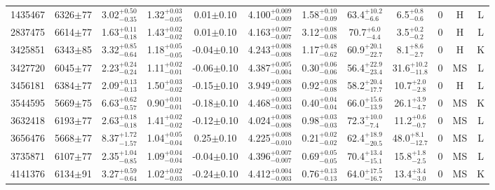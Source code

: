 \begin{longtable}{c|ccccc|ccc|ccc}
1435467 & 6326$\pm$77    & 3.02$_{-0.35}^{+0.50}$    & 1.32$_{-0.05}^{+0.03}$ & 0.01$\pm$0.10     & 4.100$_{-0.009}^{+0.009}$ & 1.58$_{-0.09}^{+0.10}$ & 63.4$_{-6.6}^{+10.2}$     & 6.5$_{-0.6}^{+0.8}$      & 0 &        H & L \\
2837475 & 6614$\pm$77    & 1.63$_{-0.18}^{+0.11}$    & 1.43$_{-0.02}^{+0.02}$ & 0.01$\pm$0.10     & 4.163$_{-0.007}^{+0.007}$ & 3.12$_{-0.08}^{+0.08}$ & 70.7$_{-4.4}^{+6.0}$      & 3.5$_{-0.2}^{+0.2}$      & 0 &        H & L \\
3425851 & 6343$\pm$85    & 3.32$_{-0.64}^{+0.85}$    & 1.18$_{-0.05}^{+0.05}$ & -0.04$\pm$0.10    & 4.243$_{-0.008}^{+0.008}$ & 1.17$_{-0.62}^{+0.48}$ & 60.9$_{-22.7}^{+20.1}$    & 8.1$_{-2.7}^{+8.6}$      & 0 &        H & K \\
3427720 & 6045$\pm$77    & 2.23$_{-0.24}^{+0.24}$    & 1.11$_{-0.01}^{+0.02}$ & -0.06$\pm$0.10    & 4.387$_{-0.004}^{+0.005}$ & 0.30$_{-0.06}^{+0.06}$ & 56.4$_{-23.4}^{+22.9}$    & 31.6$_{-11.8}^{+10.2}$   & 0 &        MS & L \\
3456181 & 6384$\pm$77    & 2.09$_{-0.13}^{+0.13}$    & 1.50$_{-0.02}^{+0.03}$ & -0.15$\pm$0.10    & 3.949$_{-0.009}^{+0.008}$ & 0.92$_{-0.08}^{+0.08}$ & 58.2$_{-17.7}^{+20.4}$    & 10.7$_{-2.8}^{+2.0}$     & 0 &        H & L \\
3544595 & 5669$\pm$75    & 6.63$_{-0.57}^{+0.62}$    & 0.90$_{-0.01}^{+0.01}$ & -0.18$\pm$0.10    & 4.468$_{-0.003}^{+0.003}$ & 0.40$_{-0.04}^{+0.04}$ & 66.0$_{-13.9}^{+15.6}$    & 26.1$_{-4.7}^{+3.9}$     & 0 &        MS & K \\
3632418 & 6193$\pm$77    & 2.63$_{-0.18}^{+0.18}$    & 1.41$_{-0.02}^{+0.02}$ & -0.12$\pm$0.10    & 4.024$_{-0.008}^{+0.008}$ & 0.98$_{-0.03}^{+0.03}$ & 72.3$_{-7.4}^{+10.0}$     & 11.2$_{-0.7}^{+0.6}$     & 0 &        MS & L \\
3656476 & 5668$\pm$77    & 8.37$_{-1.57}^{+1.72}$    & 1.04$_{-0.04}^{+0.05}$ & 0.25$\pm$0.10     & 4.225$_{-0.010}^{+0.008}$ & 0.21$_{-0.02}^{+0.02}$ & 62.4$_{-20.5}^{+18.9}$    & 48.0$_{-12.7}^{+8.1}$    & 0 &        MS & L \\
3735871 & 6107$\pm$77    & 2.35$_{-0.85}^{+1.04}$    & 1.09$_{-0.04}^{+0.04}$ & -0.04$\pm$0.10    & 4.396$_{-0.007}^{+0.007}$ & 0.69$_{-0.05}^{+0.05}$ & 70.4$_{-15.1}^{+13.4}$    & 15.8$_{-2.5}^{+1.8}$     & 0 &        MS & L \\
4141376 & 6134$\pm$91    & 3.27$_{-0.64}^{+0.59}$    & 1.02$_{-0.03}^{+0.02}$ & -0.24$\pm$0.10    & 4.412$_{-0.003}^{+0.004}$ & 0.76$_{-0.13}^{+0.13}$ & 64.0$_{-16.7}^{+17.5}$    & 13.4$_{-3.0}^{+3.4}$     & 0 &        MS & K \\

\end{longtable}
